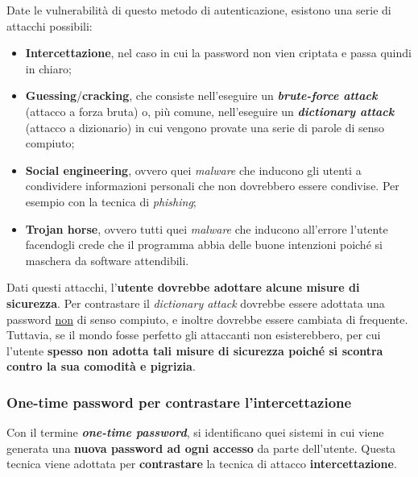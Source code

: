 \documentclass[a4paper]{article}
\begin{document}
	Date le vulnerabilità di questo metodo di autenticazione, esistono una serie di attacchi possibili:
	\begin{itemize}
		\item \textcolor{Red3}{\textbf{Intercettazione}}, nel caso in cui la password non vien criptata e passa quindi in chiaro;
		
		\item \textcolor{Red3}{\textbf{Guessing}/\textbf{cracking}}, che consiste nell'eseguire un \textbf{\emph{brute-force attack}} (attacco a forza bruta) o, più comune, nell'eseguire un \textbf{\emph{dictionary attack}} (attacco a dizionario) in cui vengono provate una serie di parole di senso compiuto;
		
		\item \textcolor{Red3}{\textbf{Social engineering}}, ovvero quei \emph{malware} che inducono gli utenti a condividere informazioni personali che non dovrebbero essere condivise. Per esempio con la tecnica di \emph{phishing};
		
		\item \textcolor{Red3}{\textbf{Trojan horse}}, ovvero tutti quei \emph{malware} che inducono all'errore l'utente facendogli crede che il programma abbia delle buone intenzioni poiché si maschera da software attendibili.
	\end{itemize}
	Dati questi attacchi, l'\textbf{utente dovrebbe adottare alcune misure di sicurezza}. Per contrastare il \emph{dictionary attack} dovrebbe essere adottata una password \underline{non} di senso compiuto, e inoltre dovrebbe essere cambiata di frequente. Tuttavia, se il mondo fosse perfetto gli attaccanti non esisterebbero, per cui l'utente \textbf{spesso non adotta tali misure di sicurezza poiché si scontra contro la sua comodità e pigrizia}.\newpage
	
	\subsubsection{One-time password per contrastare l'intercettazione}\label{one-time password per contrastare l'intercettazione}
	
	Con il termine \textcolor{Red3}{\textbf{\emph{one-time password}}}, si identificano quei sistemi in cui viene generata una \textbf{nuova password ad ogni accesso} da parte dell'utente. Questa tecnica viene adottata per \textbf{contrastare} la tecnica di attacco \textbf{intercettazione}.\newline
	
\end{document}

